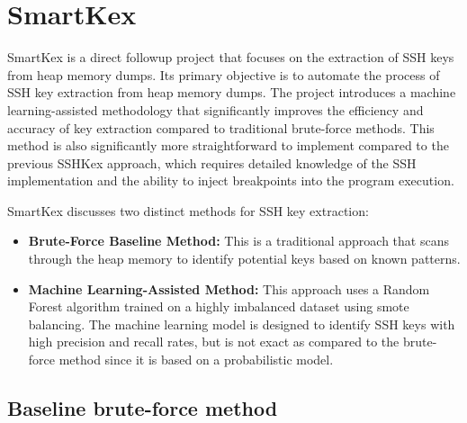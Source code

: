 \section{SmartKex}

SmartKex is a direct followup project that focuses on the extraction of SSH keys from heap memory dumps. Its primary objective is to automate the process of SSH key extraction from heap memory dumps. The project introduces a machine learning-assisted methodology that significantly improves the efficiency and accuracy of key extraction compared to traditional brute-force methods. This method is also significantly more straightforward to implement compared to the previous SSHKex approach, which requires detailed knowledge of the SSH implementation and the ability to inject breakpoints into the program execution.

SmartKex discusses two distinct methods for SSH key extraction:
\begin{itemize}
    \item \textbf{Brute-Force Baseline Method:} This is a traditional approach that scans through the heap memory to identify potential keys based on known patterns.
    \item \textbf{Machine Learning-Assisted Method:} This  approach uses a Random Forest algorithm trained on a highly imbalanced dataset using \acrshort{smote} balancing. The machine learning model is designed to identify SSH keys with high precision and recall rates, but is not exact as compared to the brute-force method since it is based on a probabilistic model.
\end{itemize}

    \subsection{Baseline brute-force method}

